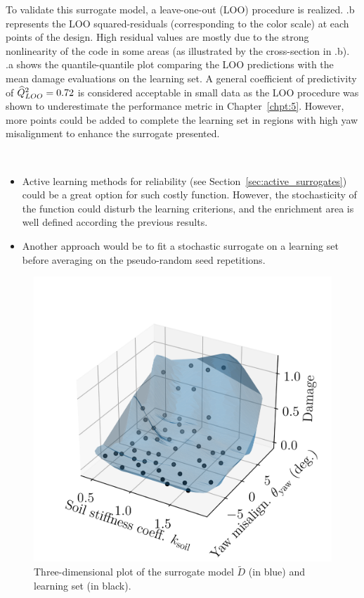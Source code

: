 To validate this surrogate model, a leave-one-out (LOO) procedure is realized. 
.b represents the LOO squared-residuals (corresponding to the color scale) at each points of the design. 
High residual values are mostly due to the strong nonlinearity of the code in some areas (as illustrated by the cross-section in .b).
.a shows the quantile-quantile plot comparing the LOO predictions with the mean damage evaluations on the learning set. 
A general coefficient of predictivity of $\widehat{Q}^2_{LOO}=0.72$ is considered acceptable in small data as the LOO procedure was shown to underestimate the performance metric in Chapter~\ref{chpt:5}. 
However, more points could be added to complete the learning set in regions with high yaw misalignment to enhance the surrogate presented.  

\begin{remark}
    ~
    \begin{itemize}
        \item Active learning methods for reliability (see Section~\ref{sec:active_surrogates}) could be a great option for such costly function. 
        However, the stochasticity of the function could disturb the learning criterions, and the enrichment area is well defined according the previous results. 
        \item Another approach would be to fit a stochastic surrogate \citep{binois_2019_replication,baker_2020_stochastic_surrogates_review,zhu_2023_thesis} on a learning set before averaging on the pseudo-random seed repetitions.  
    \end{itemize} 
\end{remark}

\begin{figure}[h!]
    \centering
    \includegraphics[width=0.52\linewidth]{./part3/figures/OWT/3D_surrogate.png}
    \caption{Three-dimensional plot of the surrogate model $\widetilde{D}$ (in blue) and learning set (in black).}
    \label{fig:3d_owt_surrogate}
\end{figure}

